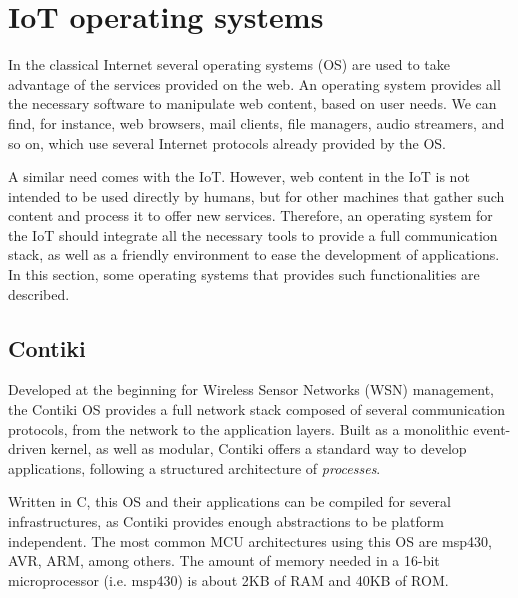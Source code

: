 \section{IoT operating systems}
In the classical Internet several operating systems (OS) are used to take advantage of the services provided on the web.
An operating system provides all the necessary software to manipulate web content, based on user needs.
We can find, for instance, web browsers, mail clients, file managers, audio streamers, and so on, which use several Internet protocols already provided by the OS.

A similar need comes with the IoT.
However, web content in the IoT is not intended to be used directly by humans, but for other machines that gather such content and process it to offer new services.
Therefore, an operating system for the IoT should integrate all the necessary tools to provide a full communication stack, as well as a friendly environment to ease the development of applications.
In this section, some operating systems that provides such functionalities are described.

\subsection{Contiki}
Developed at the beginning for Wireless Sensor Networks (WSN) management, the Contiki OS\cite{dunkels2004contiki} provides a full network stack composed of several communication protocols, from the network to the application layers.
Built as a monolithic event-driven kernel, as well as modular, Contiki offers a standard way to develop applications, following a structured architecture of \textit{processes}.

Written in C, this OS and their applications can be compiled for several infrastructures, as Contiki provides enough abstractions to be platform independent.
The most common MCU architectures using this OS are msp430, AVR, ARM, among others.
The amount of memory needed in a 16-bit microprocessor (i.e. msp430) is about 2KB of RAM and 40KB of ROM.

